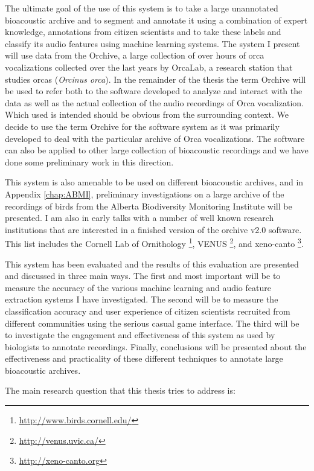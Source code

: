 \documentclass[12pt,oneside]{book}
\begin{document}
The ultimate goal of the use of this system is to take a large
unannotated bioacoustic archive and to segment and annotate it using a
combination of expert knowledge, annotations from citizen scientists
and to take these labels and classify its audio features using machine
learning systems.  The system I present will use data from the
Orchive, a large collection of over \aboutNumberOfOrchiveRecordings
hours of orca vocalizations collected over the last
\totalYearsOrcaLabCollecting years by OrcaLab, a research station that
studies orcas (\textit{Orcinus orca}).  In the remainder of the thesis
the term Orchive will be used to refer both to the software developed
to analyze and interact with the data as well as the actual collection
of the audio recordings of Orca vocalization. Which used is intended
should be obvious from the surrounding context. We decide to use the
term Orchive for the software system as it was primarily developed to
deal with the particular archive of Orca vocalizations. The software
can also be applied to other large collection of bioacoustic
recordings and we have done some preliminary work in this direction.

This system is also amenable to be used on different bioacoustic
archives, and in Appendix \ref{chap:ABMI}, preliminary investigations
on a large archive of the recordings of birds from the Alberta
Biodiversity Monitoring Institute will be presented.  I am also in
early talks with a number of well known research institutions that are
interested in a finished version of the orchive v2.0 software.  This
list includes the Cornell Lab of
Ornithology \footnote{\url{http://www.birds.cornell.edu/}},
VENUS \footnote{\url{http://venus.uvic.ca/}}, and
xeno-canto \footnote{\url{http://xeno-canto.org}}.

This system has been evaluated and the results of this evaluation are
presented and discussed in three main ways.  The first and most
important will be to measure the accuracy of the various machine
learning and audio feature extraction systems I have investigated.
The second will be to measure the classification accuracy and user
experience of citizen scientists recruited from different communities
using the serious casual game interface.  The third will be to
investigate the engagement and effectiveness of this system as used by
biologists to annotate recordings.  Finally, conclusions will be
presented about the effectiveness and practicality of these different
techniques to annotate large bioacoustic archives.


The main research question that this thesis tries to address is:
\end{document}
